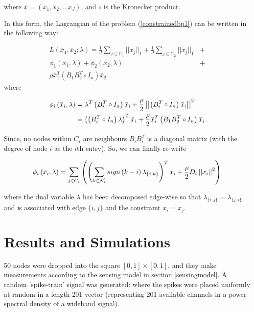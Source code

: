 where \(\bar{x} = \left(x_1, x_2, \ldots x_J \right)\), and \(\circ\) is the Kronecker product. 

In this form, the Lagrangian of the problem (\ref{constrainedbp1}) can be written in the following way:

\begin{align}
L\left(\bar{x}_1, \bar{x}_2; \lambda\right) = \frac{1}{J}\sum_{j \in C_1}||x_j||_1 + \frac{1}{J}\sum_{j \in C_2}||x_j||_1 &+ \\ \phi_1\left(\bar{x_1}, \lambda\right) + \phi_2\left(\bar{x_2}, \lambda\right) &+ \\
\rho\bar{x}_1^T\left(B_1B_2^T\circ I_n\right)\bar{x}_2
\end{align}
where 

\begin{align}
\phi_i\left(\bar{x}_i, \lambda\right) &= \lambda^T\left(B_i^T\circ I_n\right)\bar{x}_i + \frac{\rho}{2}\left|\left|\left(B_i^T\circ I_n\right)\bar{x}_i \right|\right|^2 \\
&= \left(\left(B_i^T\circ I_n\right)\lambda \right)^T\bar{x}_i + \frac{\rho}{2}\bar{x}_i^T\left(B_1B_2^T\circ I_n\right)\bar{x}_i
\end{align}

Since, no nodes within \(C_i\) are neighbours \(B_iB_i^T\) is a diagonal matrix (with the degree of node \(i\) as the \(i\)th entry). So, we can finally re-write

\begin{equation}
\phi_i\left(\bar{x}_i, \lambda\right) = \sum_{j \in C_i}\left(\left(\sum_{k \in \mathcal{N}_i} sign\left(k-i\right)\lambda_{\{i,k\}}\right)^T x_i + \frac{\rho}{2}D_i\left|\left|x_i\right|\right|^2  \right)
\end{equation}

where the dual variable \(\lambda\) has been decomposed edge-wise so that \(\lambda_{\{i,j\}} = \lambda_{\{j,i\}}\) and is associated with edge \(\{i,j\}\) and the constraint \(x_i = x_j\).
 

\section{Results and Simulations}
50 nodes were dropped into the square \( \left[0,1\right] \times \left[0,1\right] \), and they make measurements according to the sensing model in section \ref{sensingmodel}. A random 'spike-train' signal was generated: where the spikes were placed uniformly at random in a length 201 vector (representing 201 available channels in a power spectral density of a wideband signal). 

